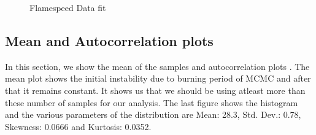  \begin{figure}[H]
  \ContinuedFloat
  \centering
  \caption{Flamespeed Data fit}
\end{figure}



\subsection{Mean and Autocorrelation plots}

 In this section, we show the mean of the samples and autocorrelation plots . The mean plot shows the initial instability due to burning period of MCMC and after that it remains constant. It shows us that we should be using atleast more than these number of samples for our analysis. The last figure shows the histogram and the various parameters of the distribution are Mean:  28.3, Std. Dev.:  0.78, Skewness:  0.0666 and Kurtosis:  0.0352.



